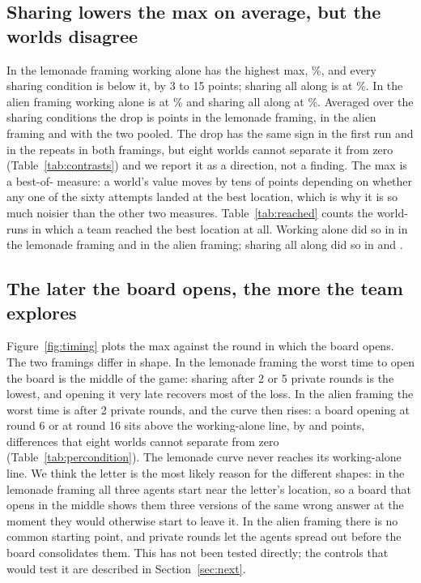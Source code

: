 \subsection{Sharing lowers the max on average, but the worlds disagree}
In the lemonade framing working alone has the highest max, \LemSoloMax\%, and every sharing condition is
below it, by 3 to 15 points; sharing all along is at \LemShareMax\%. In the alien framing working alone is at
\AliSoloMax\% and sharing all along at \AliShareMax\%. Averaged over the sharing conditions the drop is
\AllLemMax{} points in the lemonade framing, \AllAliMax{} in the alien framing and \AllBothMax{} with the two
pooled. The drop has the same sign in the first run and in the repeats in both framings, but eight worlds
cannot separate it from zero (Table~\ref{tab:contrasts}) and we report it as a direction, not a finding. The max is a best-of-\NAttempts{} measure: a world's value moves by tens of points depending on
whether any one of the sixty attempts landed at the best location, which is why it is so much noisier than
the other two measures. Table~\ref{tab:reached} counts the world-runs in which a team reached the best
location at all. Working alone did so in \LemSoloReached{} in the lemonade framing and \AliSoloReached{} in the
alien framing; sharing all along did so in \LemShareReached{} and \AliShareReached{}.

\begin{table}[t]
  \centering
  \caption{Sharing all along reaches the best location in fewer world-runs than three agents working alone, in both framings. World-runs in which the team's best round was at the best location (max above 60\% of the optimum), out of the world-runs played.}
  \label{tab:reached}
  \small
  
\end{table}

\subsection{The later the board opens, the more the team explores}
Figure~\ref{fig:timing} plots the max against the round in which the board opens. The two framings differ in
shape. In the lemonade framing the worst time to open the board is the middle of the game: sharing after 2 or
5 private rounds is the lowest, and opening it very late recovers most of the loss. In the alien framing the
worst time is after 2 private rounds, and the curve then rises: a board opening at round 6 or at round 16 sits
above the working-alone line, by \DAliFromSixMax{} and \DAliFromSixteenMax{} points, differences that eight
worlds cannot separate from zero (Table~\ref{tab:percondition}). The lemonade curve never reaches its
working-alone line. We think the letter is the most likely reason for the different shapes: in the lemonade framing all three agents start near the letter's
location, so a board that opens in the middle shows them three versions of the same wrong answer at the moment
they would otherwise start to leave it. In the alien framing there is no common starting point, and private
rounds let the agents spread out before the board consolidates them. This has not been tested directly; the
controls that would test it are described in Section~\ref{sec:next}.

